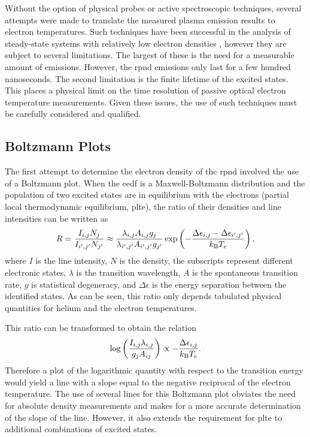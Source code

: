 Without the option of physical probes or active spectroscopic techniques,
several attempts were made to translate the measured plasma emission results to
electron temperatures. Such techniques have been successful in the analysis of
steady-state systems with relatively low electron densities \cite{Kunze2009},
however they are subject to several limitations. The largest of these is the
need for a measurable amount of emissions. However, the \acs{rpnd} emissions
only last for a few hundred nanoseconds. The second limitation is the finite
lifetime of the excited states. This places a physical limit on the time
resolution of passive optical electron temperature measurements. Given these
issues, the use of such techniques must be carefully considered and qualified.

\subsection{Boltzmann Plots}

The first attempt to determine the electron density of the \acs{rpnd} involved
the use of a Boltzmann plot. When the \acs{eedf} is a Maxwell-Boltzmann
distribution and the population of two excited states are in equilibrium with
the electrons (partial local thermodynamic equilibrium, \acs{plte}), the ratio
of their densities and line intensities can be written as \cite{Griem2005}
\begin{equation}
  R = \frac{I_{i,j}N_j}{I_{i',j'}N_{j'}}
    \approx \frac{\lambda_{i,j}A_{i,j}g_j}{\lambda_{i',j'}A_{i',j'}g_{j'}}
            \exp\left( -\frac{\Delta\epsilon_{i,j} - \Delta\epsilon_{i',j'}}
                      {k_\mathrm{B} T_e} \right),
\end{equation}
where $I$ is the line intensity, $N$ is the density, the subscripts represent
different electronic states, $\lambda$ is the transition wavelength, $A$ is the
spontaneous transition rate, $g$ is statistical degeneracy, and $\Delta\epsilon$
is the energy separation between the identified states. As can be seen, this
ratio only depends tabulated physical quantities for helium and the electron
temperatures.

This ratio can be transformed to obtain the relation
\begin{equation}
  \log \left( \frac{I_{i,j}\lambda_{i,j}}{g_jA_{ij}} \right)
  \propto -\frac{\Delta\epsilon_{i,j}}{k_\mathrm{B} T_e}.
\end{equation}
Therefore a plot of the logarithmic quantity with respect to the transition
energy would yield a line with a slope equal to the negative reciprocal of the
electron temperature. The use of several lines for this Boltzmann plot obviates
the need for absolute density measurements and makes for a more accurate
determination of the slope of the line. However, it also extends the requirement
for \acs{plte} to additional combinations of excited states.

